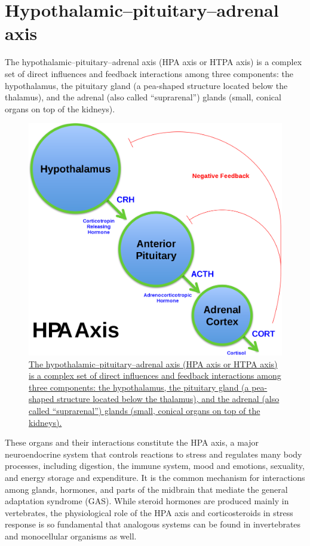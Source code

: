 \hypertarget{hypothalamicpituitaryadrenal-axis}{%
\section{Hypothalamic--pituitary--adrenal axis}\label{hypothalamicpituitaryadrenal-axis}}

The hypothalamic--pituitary--adrenal axis (HPA axis or HTPA axis) is a complex set of direct influences and feedback interactions among three components: the hypothalamus, the pituitary gland (a pea-shaped structure located below the thalamus), and the adrenal (also called ``suprarenal'') glands (small, conical organs on top of the kidneys).



\begin{figure}

{\centering \includegraphics[width=0.7\linewidth]{./figures/endocrine/HPA Axis} 

}

\caption{\href{https://commons.wikimedia.org/wiki/File:HPA_Axis_Diagram_(Brian_M_Sweis_2012).svg}{The hypothalamic--pituitary--adrenal axis (HPA axis or HTPA axis) is a complex set of direct influences and feedback interactions among three components: the hypothalamus, the pituitary gland (a pea-shaped structure located below the thalamus), and the adrenal (also called ``suprarenal'') glands (small, conical organs on top of the kidneys).}}\label{fig:hpadrenal}
\end{figure}

These organs and their interactions constitute the HPA axis, a major neuroendocrine system that controls reactions to stress and regulates many body processes, including digestion, the immune system, mood and emotions, sexuality, and energy storage and expenditure. It is the common mechanism for interactions among glands, hormones, and parts of the midbrain that mediate the general adaptation syndrome (GAS). While steroid hormones are produced mainly in vertebrates, the physiological role of the HPA axis and corticosteroids in stress response is so fundamental that analogous systems can be found in invertebrates and monocellular organisms as well.

